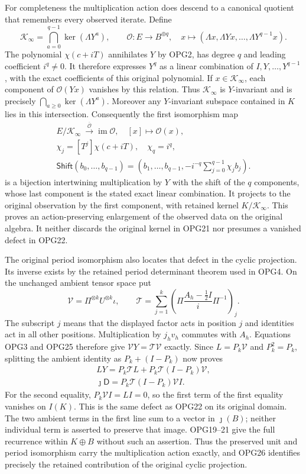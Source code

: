 For completeness the multiplication action does descend to a
canonical quotient that remembers every observed iterate. Define
\[
 \mathcal K_\infty=\bigcap_{a=0}^{q-1}\ker(\Lambda Y^a),\qquad
 \mathcal O:E\to B^{\oplus q},\quad
 x\longmapsto(\Lambda x,\Lambda Yx,\ldots,\Lambda Y^{q-1}x).
 \tag{OPG23}
\]
The polynomial $\chi(c+iT)$ annihilates $Y$ by OPG2, has degree
$q$ and leading coefficient $i^q\ne0$. It therefore expresses
$Y^q$ as a linear combination of $I,Y,\ldots,Y^{q-1}$, with
the exact coefficients of this original polynomial. If
$x\in\mathcal K_\infty$, each component of $\mathcal O(Yx)$
vanishes by this relation. Thus $\mathcal K_\infty$ is
$Y$-invariant and is precisely $\bigcap_{a\geq0}\ker(\Lambda Y^a)$.
Moreover any $Y$-invariant subspace contained in $K$ lies in
this intersection. Consequently the first isomorphism map
\[
\begin{gathered}
 E/\mathcal K_\infty\ \xrightarrow{\ \overline{\mathcal O}\ }
 \operatorname{im}\mathcal O,\quad[x]\longmapsto\mathcal O(x),\\
 \chi_j=[T^j]\chi(c+iT),\quad\chi_q=i^q,\\
 \mathsf{Shift}(b_0,\ldots,b_{q-1})=
 \left(b_1,\ldots,b_{q-1},-i^{-q}\sum_{j=0}^{q-1}\chi_j b_j\right).
\end{gathered}
 \tag{OPG24}
\]
is a bijection intertwining multiplication by $Y$ with the shift
of the $q$ components, whose last component is the stated exact
linear combination. It projects to the original observation by
the first component, with retained kernel $K/\mathcal K_\infty$.
This proves an action-preserving enlargement of the observed
data on the original algebra. It neither discards the original
kernel in OPG21 nor presumes a vanished defect in OPG22.

The original period isomorphism also locates that defect in the
cyclic projection. Its inverse exists by the retained period
determinant theorem used in OPG4. On the unchanged ambient tensor
space put
\[
 \mathcal V=\Pi^{\otimes k}U^{\otimes k}\iota,
 \qquad
 \mathcal T=\sum_{j=1}^k
 \left(\Pi\frac{A_h-\tfrac12I}{i}\Pi^{-1}\right)_j.
 \tag{OPG25}
\]
The subscript $j$ means that the displayed factor acts in position
$j$ and identities act in all other positions. Multiplication by
$j_hv_h$ commutes with $A_h$. Equations OPG3 and OPG25 therefore
give $\mathcal VY=\mathcal T\mathcal V$ exactly. Since
$L=P_k\mathcal V$ and $P_k^2=P_k$, splitting the ambient identity
as $P_k+(I-P_k)$ now proves
\[
\begin{gathered}
 LY=P_k\mathcal T L+P_k\mathcal T(I-P_k)\mathcal V,\\
 \jmath\mathsf D=P_k\mathcal T(I-P_k)\mathcal V I.
\end{gathered}\tag{OPG26}
\]
For the second equality, $P_k\mathcal V I=LI=0$, so the
first term of the first equality vanishes on $I(K)$. This is
the same defect as OPG22 on its original domain. The two ambient
terms in the first line sum to a vector in $\jmath(B)$; neither
individual term is asserted to preserve that image. OPG19--21
give the full recurrence within $K\oplus B$ without such an
assertion. Thus the preserved unit and period isomorphism carry
the multiplication action exactly, and OPG26 identifies precisely
the retained contribution of the original cyclic projection.

